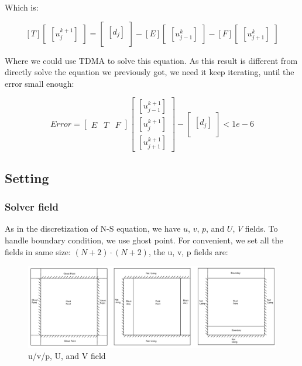 \documentclass[12pt]{article}
\begin{document}
Which is:

\[
\left[
T
\right]
\begin{bmatrix}
    [u_{j}^{k+1}]
\end{bmatrix}
=
\begin{bmatrix}
    [d_{j}] \\
\end{bmatrix}
-
\left[
E
\right]
\begin{bmatrix}
    [u_{j-1}^{k}]
\end{bmatrix}
-
\left[
F
\right]
\begin{bmatrix}
    [u_{j+1}^{k}]
\end{bmatrix}
\]







Where we could use TDMA to solve this equation. As this result is different from directly solve the equation we previously got, we need it keep iterating, until the error small enough:


\[ 
Error = 
\left[
\begin{array}{c|c|c}
E & T & F 
\end{array}
\right]
\begin{bmatrix}
    [u_{j-1}^{k+1}] \\
    [u_{j}^{k+1}] \\
   [ u_{j+1}^{k+1}]
\end{bmatrix}
-
\begin{bmatrix}
    [d_{j}] \\
\end{bmatrix}
<1e-6
\]



\subsection{Setting}
\subsubsection{Solver field}
As in the discretization of N-S equation, we have $u$, $v$, $p$, and $U$, $V$ fields. To handle boundary condition, we use ghost point. For convenient, we set all the fields in same size: $(N+2) \cdot (N+2)$, the u, v, p fields are:

\begin{figure}[H]
    \centering
    \includegraphics[width=0.9\linewidth]{figures/Solver/Domain.jpg}
    \caption{u/v/p, U, and V field}
\end{figure}
\end{document}
